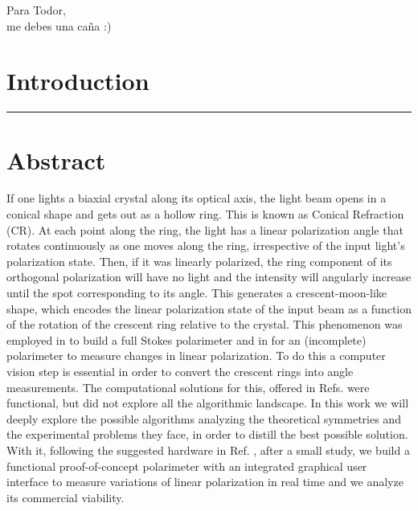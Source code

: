 \documentclass[11pt, a4paper, twoside]{article} %
\newenvironment{dedication}
  {\clearpage           %
   \thispagestyle{empty}%
   \vspace*{\stretch{1}}%
   \itshape             %
   \raggedleft          %
  }
  {\par %
   \vspace{\stretch{3}} %
   \clearpage           %
  }
\begin{document}
\newpage
\null
\clearpage
\newpage
\begin{dedication}
Para Todor,\\ me debes una caña :)
\end{dedication}
\newpage
\null
\clearpage
\newpage
\clearpage
\maketitle
\vspace{-0.3cm}
\setlength{\cftbeforesecskip}{0.4cm}
\setlength{\cftbeforesubsecskip}{0.4cm}
\setlength{\cftbeforesubsubsecskip}{0.25cm}

\tableofcontents
\clearpage
{}
\setcounter{page}{1}
\vspace{-0.3 cm}

\pagestyle{fancy}

\section*{\centering \huge{Introduction}\vspace{-0.35cm}}
\noindent\rule{\textwidth}{0.4pt}
\vspace{-0.8cm}
\section*{Abstract\vspace{-0.1cm}}
If one lights a biaxial crystal along its optical axis, the light beam opens in a conical shape and gets out as a hollow ring. This is known as Conical Refraction (CR). At each point along the ring, the light has a linear polarization angle that rotates continuously as one moves along the ring, irrespective of the input light's polarization state. Then, if it was linearly polarized, the ring component of its orthogonal polarization will have no light and the intensity will angularly increase until the spot corresponding to its angle. This generates a crescent-moon-like shape, which encodes the linear polarization state of the input beam as a function of the rotation of the crescent ring relative to the crystal. This phenomenon was employed in \cite{Stokes1, Stokes2} to build a full Stokes polarimeter and in \cite{incomplete} for an (incomplete) polarimeter to measure changes in linear polarization. To do this a computer vision step is essential in order to convert the crescent rings into angle measurements. The computational solutions for this, offered in Refs. \cite{incomplete, Stokes1, Stokes2} were functional, but did not explore all the algorithmic landscape. In this work we will deeply explore the possible algorithms analyzing the theoretical symmetries and the experimental problems they face, in order to distill the best possible solution. With it, following the suggested hardware in Ref. \cite{incomplete}, after a small study, we build a functional proof-of-concept polarimeter with an integrated graphical user interface to measure variations of linear polarization in real time and we analyze its commercial viability.
\end{document}
